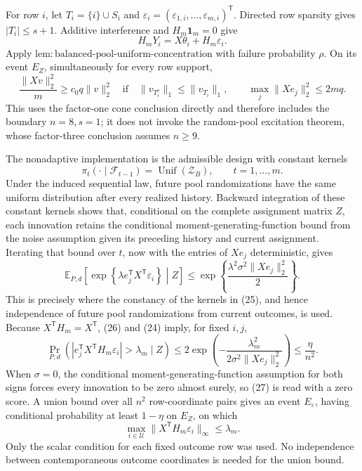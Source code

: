 For row \(i\), let \(T_i=\{i\}\cup S_i\) and \(\varepsilon_i=(\varepsilon_{1,i},\ldots,\varepsilon_{m,i})^{\mathsf T}\).  Directed row sparsity gives \(|T_i|\le s+1\).  Additive interference and \(H_m\mathbf1_m=0\) give
\[
 H_mY_i=X\theta_i+H_m\varepsilon_i.
 \tag{23}
\]
Apply \(\mathrm{lem{:}balanced\text{-}pool\text{-}uniform\text{-}concentration}\) with failure probability \(\rho\).  On its event \(E_Z\), simultaneously for every row support,
\[
 \frac{\lVert Xv\rVert_2^2}{m}\ge c_0q\lVert v\rVert_2^2
 \quad\text{if}\quad
 \lVert v_{T_i^c}\rVert_1\le\lVert v_{T_i}\rVert_1,
 \qquad
 \max_j\lVert Xe_j\rVert_2^2\le2mq.
 \tag{24}
\]
This uses the factor-one cone conclusion directly and therefore includes the boundary \(n=8,s=1\); it does not invoke the random-pool excitation theorem, whose factor-three conclusion assumes \(n\ge9\).

The nonadaptive implementation is the admissible design with constant kernels
\[
 \pi_t(\cdot\mid\mathcal F_{t-1})=\operatorname{Unif}(\mathcal Z_B),
 \qquad t=1,\ldots,m.
 \tag{25}
\]
Under the induced sequential law, future pool randomizations have the same uniform distribution after every realized history.  Backward integration of these constant kernels shows that, conditional on the complete assignment matrix \(Z\), each innovation retains the conditional moment-generating-function bound from the noise assumption given its preceding history and current assignment.  Iterating that bound over \(t\), now with the entries of \(Xe_j\) deterministic, gives
\[
 \mathbb E_{P,d}\!\left[\exp\!\left\{\lambda e_j^{\mathsf T}X^{\mathsf T}\varepsilon_i\right\}\middle|Z\right]
 \le \exp\!\left\{\frac{\lambda^2\sigma^2\lVert Xe_j\rVert_2^2}{2}\right\}.
 \tag{26}
\]
This is precisely where the constancy of the kernels in (25), and hence independence of future pool randomizations from current outcomes, is used.  Because \(X^{\mathsf T}H_m=X^{\mathsf T}\), (26) and (24) imply, for fixed \(i,j\),
\[
 \Pr_{P,d}\!\left(
  |e_j^{\mathsf T}X^{\mathsf T}H_m\varepsilon_i|>\lambda_m\mid Z
 \right)
 \le2\exp\!\left(-\frac{\lambda_m^2}
 {2\sigma^2\lVert Xe_j\rVert_2^2}\right)
 \le\frac{\eta}{n^2}.
 \tag{27}
\]
When \(\sigma=0\), the conditional moment-generating-function assumption for both signs forces every innovation to be zero almost surely, so (27) is read with a zero score.  A union bound over all \(n^2\) row-coordinate pairs gives an event \(E_\varepsilon\), having conditional probability at least \(1-\eta\) on \(E_Z\), on which
\[
 \max_{i\in\mathcal U}\lVert X^{\mathsf T}H_m\varepsilon_i\rVert_\infty
 \le\lambda_m.
 \tag{28}
\]
Only the scalar condition for each fixed outcome row was used.  No independence between contemporaneous outcome coordinates is needed for the union bound.


